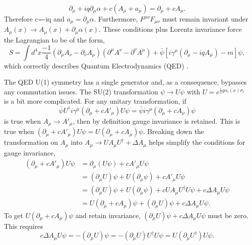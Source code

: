 \begin{equation}
\partial_\mu + iq\partial_\mu\alpha + c(A_\mu + a_\mu) = \partial_\mu + cA_\mu. 
\end{equation}
Therefore c=-iq and $a_\mu = \partial_\mu\alpha$. Furthermore, $F^{\mu\nu}F_{\mu\nu}$ must remain invariant under $A_\mu(x) \rightarrow A_\mu(x) + \partial_\mu\alpha(x)$. These conditions plus Lorentz invariance force the Lagrangian to be of the form, 
\begin{equation}
S = \int d^4x \frac{-1}{4}(\partial_\mu A_\nu - \partial_\nu A_\mu)(\partial^\mu A^\nu - \partial^\nu A^\mu) + \bar{\psi}\left[i\gamma^\mu\left(\partial_\mu - iqA_\mu\right) - m \right]\psi, 
\end{equation}
which correctly describes Quantum Electrodynamics (QED) \cite{zee}.

The QED U(1) symmetry has a single generator and, as a consequence, bypasses any commutation issues. The SU(2) transformation $\psi \rightarrow U\psi$ with $U = e^{\frac{i}{2}q\alpha_i(x)\sigma_i}$ is a bit more complicated. For any unitary transformation, if 
\begin{equation}
\bar{\psi}U^\dagger i\gamma^\mu\left(\partial_\mu + cA'_{\mu}\right)U\psi = \bar{\psi}i\gamma^\mu\left(\partial_\mu + cA_{\mu}\right)\psi 
\end{equation}
is true when $A_\mu \rightarrow A'_\mu$, then by definition gauge invariance is retained. This is true when $\left(\partial_\mu + cA'_{\mu}\right)U\psi =U\left(\partial_\mu + cA_{\mu}\right)\psi$. Breaking down the transformation on $A_{\mu}$ into $A_\mu \rightarrow UA_\mu U^\dagger + \Delta A_{\mu}$ helps simplify the conditions for gauge invariance, 
\begin{equation}
\begin{split}
\left(\partial_\mu + cA'_{\mu}\right)U\psi &=  \partial_\mu(U\psi) + cA'_{\mu}U\psi \\
& = (\partial_\mu U)\psi + U(\partial_\mu\psi) + cA'_{\mu}U\psi \\ 
& = (\partial_\mu U)\psi + U(\partial_\mu\psi) + cUA_{\mu}U^\dagger U\psi + c\Delta A_{\mu}U\psi \\
& = U\left(\partial_\mu + cA_{\mu}\right)\psi + (\partial_\mu U)\psi + c\Delta A_{\mu}U\psi.
\end{split}
\end{equation}
To get $U\left(\partial_\mu + cA_{\mu}\right)\psi$ and retain invariance, $(\partial_\mu U)\psi + c\Delta A_{\mu}U\psi$ must be zero. This requires 
\begin{equation}
c\Delta A_{\mu}U\psi = -(\partial_\mu U)\psi = - (\partial_\mu U)U^\dagger U\psi = U(\partial_\mu U^\dagger) U\psi.
\end{equation}
